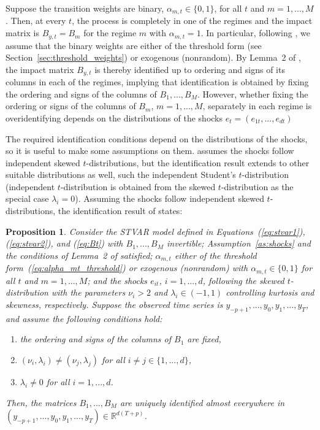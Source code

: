 \documentclass[nojss]{jss}
\newtheorem{proposition}{Proposition}
\begin{document}
Suppose the transition weights are binary, $\alpha_{m,t}\in\lbrace 0, 1\rbrace$, for all $t$ and $m=1,...,M$. Then, at every $t$, the process is completely in one of the regimes and the impact matrix is $B_{y,t}=B_m$ for the regime $m$ with $\alpha_{m,t}=1$. In particular, following \cite{Virolainen2:2024}, we assume that the binary weights are either of the threshold form (see Section~\ref{sec:threshold_weights}) or exogenous (nonrandom). By Lemma~2 of \cite{Virolainen2:2024}, the impact matrix $B_{y,t}$ is thereby identified up to ordering and signs of its columns in each of the regimes, implying that identification is obtained by fixing the ordering and signs of the columns of $B_1,...,B_M$. However, whether fixing the ordering or signs of the columns of $B_m$, $m=1,...,M$‚ separately in each regime is overidentifying depends on the distributions of the shocks $e_t=(e_{1t},...,e_{dt})$ \citep[see the discussion in]{Virolainen2:2024}

The required identification conditions depend on the distributions of the shocks, so it is useful to make some assumptions on them. \cite{Virolainen2:2024} assumes the shocks follow independent skewed $t$-distributions, but the identification result extends to other suitable distributions as well, such the independent Student's $t$-distribution (independent $t$-distribution is obtained from the skewed $t$-distribution as the special case $\lambda_i=0$). Assuming the shocks follow independent skewed $t$-distributions, the identification result of \citet[][Proposition~1]{Virolainen2:2024} states:

\begin{proposition}\label{prop:tvar_ident}
Consider the STVAR model defined in Equations~(\ref{eq:stvar1}), (\ref{eq:stvar2}), and (\ref{eq:Bt}) with $B_1,...,B_M$ invertible; Assumption~\ref{as:shocks} and the conditions of Lemma~2 of \cite{Virolainen2:2024} satisfied; $\alpha_{m,t}$ either of the threshold form~(\ref{eq:alpha_mt_threshold}) or exogenous (nonrandom) with $\alpha_{m,t}\in\lbrace 0, 1\rbrace$ for all $t$ and $m=1,...,M$; and the shocks $e_{it}$, $i=1,...,d$, following the skewed $t$-distribution with the parameters $\nu_i>2$ and $\lambda_i\in (-1, 1)$ controlling kurtosis and skewness, respectively. Suppose the observed time series is $y_{-p+1},...,y_{0},y_{1},...,y_{T}$, and assume the following conditions hold:
\begin{enumerate}%
\item the ordering and signs of the columns of $B_1$ are fixed, \label{cond:tvar_B1}
\item $(\nu_i,\lambda_i)\neq (\nu_j,\lambda_j)$ for all $i\neq j\in\lbrace 1,...,d\rbrace$, \label{cond:tvar_nulambda}
\item $\lambda_i\neq 0$ for all $i=1,...,d$. \label{cond:tvar_lambda}
\end{enumerate}
Then, the matrices $B_1,...,B_M$ are uniquely identified almost everywhere in $(y_{-p+1},...,y_0,y_1,...,y_T)\in\mathbb{R}^{d(T+p)}$.
\end{proposition}
\end{document}
